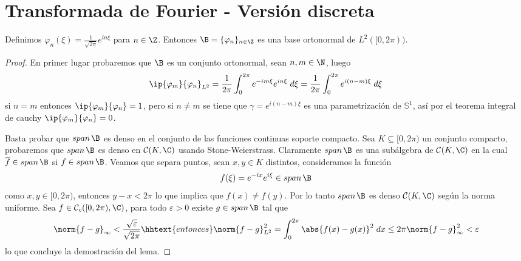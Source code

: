\documentclass{article}
\begin{document}
\section{Transformada de Fourier - Versión discreta}
\begin{lema}
    Definimos $\varphi_{n}(\xi)=\frac{1}{\sqrt{2\pi}}e^{in\xi}$ para $n\in\Z$. Entonces 
    $\B=\{\varphi_{n}\}_{n\in\Z}$ es una base ortonormal de $L^{2}([0,2\pi))$.
\end{lema}
\begin{proof}
    En primer lugar probaremos que $\B$ es un conjunto ortonormal, sean $n,m\in\N$, luego
    \begin{equation*}
        \ip{\varphi_{m}}{\varphi_{n}}_{L^{2}}
        =\frac{1}{2\pi}\int_{0}^{2\pi}e^{-im\xi}e^{in\xi}\hspace{1mm}d\xi
        =\frac{1}{2\pi}\int_{0}^{2\pi}e^{i(n-m)\xi}\hspace{1mm}d\xi
    \end{equation*}
    si $n=m$ entonces $\ip{\varphi_{m}}{\varphi_{n}}=1$, pero si $n\neq m$ se tiene que 
    $\gamma=e^{i(n-m)\xi}$ es una parametrización de $\mathbb{S}^{1}$, así por el teorema integral
    de cauchy $\ip{\varphi_{m}}{\varphi_{n}}=0$.
    
    \vspace{1mm}
    \noindent Basta probar que $span\hspace{0.5mm}\B$ es denso en el conjunto de las funciones 
    continuas soporte compacto. Sea $K\subseteq[0,2\pi)$ un conjunto compacto, probaremos que 
    $span\hspace{0.5mm}\B$ es denso en $\mathcal{C}(K,\C)$ usando Stone-Weierstrass. Claramente
    $span\hspace{0.5mm}\B$ es una subálgebra de $\mathcal{C}(K,\C)$ en la cual 
    $\overline{f}\in span\hspace{0.5mm}\B$ si $f\in span\hspace{0.5mm}\B$. Veamos que separa 
    puntos, sean $x,y\in K$ distintos, consideramos la función
    \begin{equation*}
        f(\xi)=e^{-ix}e^{i\xi}\in span\hspace{0.5mm}\B
    \end{equation*}
    como $x,y\in[0,2\pi)$, entonces $y-x<2\pi$ lo que implica que $f(x)\neq f(y)$. Por lo tanto 
    $span\hspace{0.5mm}\B$ es denso $\mathcal{C}(K,\C)$ según la norma uniforme. Sea 
    $f\in\mathcal{C}_{c}([0,2\pi),\C)$, para todo $\varepsilon>0$ existe 
    $g\in span\hspace{0.5mm}\B$ tal que
    \begin{equation*}
        \norm{f-g}_{\infty}<\frac{\sqrt{\varepsilon}}{\sqrt{2\pi}}
        \hhtext{entonces}
        \norm{f-g}_{L^{2}}^{2}=\int_{0}^{2\pi}\abs{f(x)-g(x)}^{2}\hspace{1mm}dx
        \leq2\pi\norm{f-g}_{\infty}^{2}<\varepsilon
    \end{equation*}
    lo que concluye la demostración del lema.
\end{proof}
\end{document}
